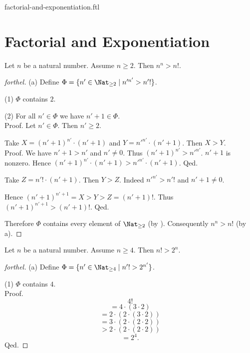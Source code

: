 \documentclass{naproche-library}
\begin{document}
\begin{smodule}{factorial-and-exponentiation.ftl}

  \section*{Factorial and Exponentiation}

  \begin{proposition}[forthel,id=ARITHMETIC_12_8113296594960384]
    Let $n$ be a natural number.
    Assume $n \geq 2$.
    Then $n^{n} > n!$.
  \end{proposition}
  \begin{proof}[forthel]
    (a) Define $\Phi = \{ n' \in \Nat_{\geq 2} \mid n'^{n'} > n'! \}$.

    (1) $\Phi$ contains $2$.

    (2) For all $n' \in \Phi$ we have $n' + 1 \in \Phi$. \\
    Proof.
      Let $n' \in \Phi$.
      Then $n' \geq 2$.

      Take $X = (n' + 1)^{n'} \cdot (n' + 1)$ and $Y = n'^{n'} \cdot (n' + 1)$.
      Then $X > Y$. \\
      Proof.
        We have $n' + 1 > n'$ and $n' \neq 0$.
        Thus $(n' + 1)^{n'} > n'^{n'}$.
        $n' + 1$ is nonzero.
        Hence $(n' + 1)^{n'} \cdot (n' + 1) > n'^{n'} \cdot (n' + 1)$.
      Qed.

      Take $Z = n'! \cdot (n' + 1)$.
      Then $Y > Z$.
      Indeed $n'^{n'} > n'!$ and $n' + 1 \neq 0$.

      Hence $(n' + 1)^{n' + 1} = X > Y > Z = (n' + 1)!$.
      Thus $(n' + 1)^{n' + 1} > (n' + 1)!$.
    Qed.

    Therefore $\Phi$ contains every element of $\Nat_{\geq 2}$ (by ).
    Consequently $n^{n} > n!$ (by a).
  \end{proof}

  \begin{proposition}[forthel,id=ARITHMETIC_12_5413271156817920]
    Let $n$ be a natural number.
    Assume $n \geq 4$.
    Then $n! > 2^{n}$.
  \end{proposition}
  \begin{proof}[forthel]
    (a) Define $\Phi = \{ n' \in \Nat_{\geq 4} \mid n'! > 2^{n'} \}$.

    (1) $\Phi$ contains $4$. \\
    Proof.
      \[  4!                                  \]
      \[    = 4 \cdot (3 \cdot 2)             \]
      \[    = 2 \cdot (2 \cdot (3 \cdot 2))   \]
      \[    = 3 \cdot (2 \cdot (2 \cdot 2))   \]
      \[    > 2 \cdot (2 \cdot (2 \cdot 2))   \]
      \[    = 2^{4}.                          \]
    Qed.


\end{proof}
\end{smodule}
\end{document}
